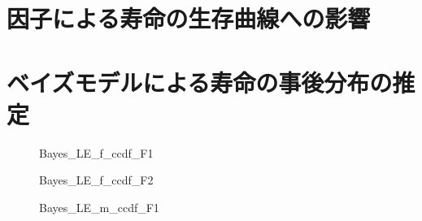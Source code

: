 \documentclass[a4j,11pt,mc]{jreport}
\begin{document}
\section{因子による寿命の生存曲線への影響}

\section{ベイズモデルによる寿命の事後分布の推定}
	\begin{figure}[H]
		\begin{center}
				\caption{Bayes\_LE\_f\_ccdf\_F1}
		\end{center}
	\end{figure}


	\begin{figure}[H]
		\begin{center}
				\caption{Bayes\_LE\_f\_ccdf\_F2}
		\end{center}
	\end{figure}



	\begin{figure}[H]
		\begin{center}
				\caption{Bayes\_LE\_m\_ccdf\_F1}
		\end{center}
	\end{figure}
\end{document}
